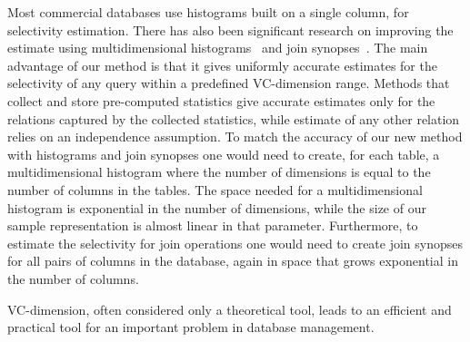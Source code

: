 Most commercial databases use histograms built on a single column, for selectivity
estimation. There has also been significant research on improving the estimate
using multidimensional
histograms~\citep{BrunoCG01,PoosalaI97,SrivastavaHMKT,WangS03} and join
synopses~\citep{AcharyaGPR99}. The main advantage of our method is that it gives
uniformly accurate estimates for the selectivity of any query within a predefined
VC-dimension range. Methods that collect and store pre-computed statistics give
accurate estimates only for the relations captured by the collected statistics,
while estimate of any other relation relies on an independence assumption.
To match the accuracy of our new method with histograms and join synopses
one would need to create, for each table, a multidimensional histogram where the
number of dimensions is equal to the number of columns in the tables. The space
needed for a multidimensional histogram is exponential in the number of
dimensions, while the size of our sample representation is almost linear in that parameter. 
Furthermore, to estimate the selectivity for join operations
one would need to create join synopses for all pairs of columns in the database,
again in space that grows exponential in the number of columns.

VC-dimension, often considered only a theoretical tool, leads to an efficient
and practical tool for an important problem in database management.


